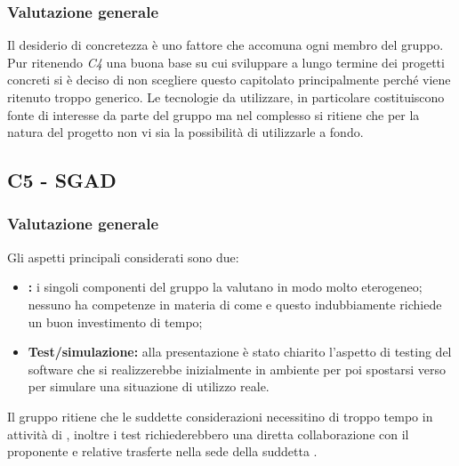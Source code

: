         \subsubsection{Valutazione generale}
        Il desiderio di concretezza è uno fattore che accomuna ogni membro del gruppo. Pur ritenendo \emph{C4} una buona base su cui sviluppare a lungo termine dei progetti concreti si è deciso di non scegliere questo capitolato principalmente perché viene ritenuto troppo generico.
        Le tecnologie da utilizzare, in particolare   costituiscono fonte di interesse da parte del gruppo ma nel complesso si ritiene che per la natura del progetto non vi sia la possibilità di utilizzarle a fondo.
        
\subsection{C5 - SGAD}
        \subsubsection{Valutazione generale}
        Gli aspetti principali considerati sono due:
        \begin{itemize}
            \item \textbf{ :} i singoli componenti del gruppo la valutano in modo molto eterogeneo; nessuno ha competenze in materia di   come   e questo indubbiamente richiede un buon investimento di tempo;
            \item \textbf{Test/simulazione:} alla presentazione è stato chiarito l'aspetto di testing del software che si realizzerebbe inizialmente in ambiente   per poi spostarsi verso  per simulare una situazione di utilizzo reale.
        \end{itemize}
        Il gruppo ritiene che le suddette considerazioni necessitino di troppo tempo in attività di , inoltre i test richiederebbero una diretta collaborazione con il proponente   e relative trasferte nella sede della suddetta .

